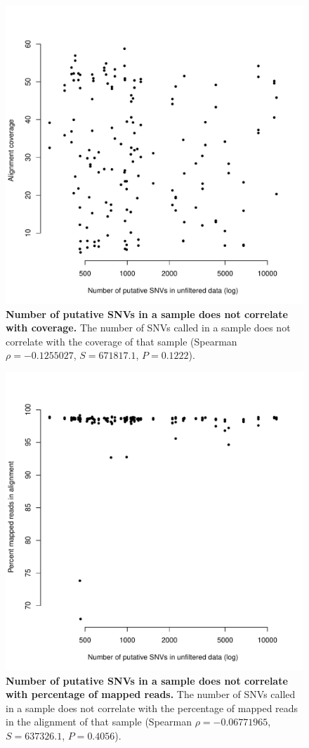 \documentclass[11 pt]{article} %
\begin{document}
\begin{figure}
\centerline{
\includegraphics[width=5in]{QualFigure1.pdf} }
\caption{\textbf{Number of putative SNVs in a sample does not correlate with coverage.} The number of SNVs called in a sample does not correlate with the coverage of that sample  (Spearman $\rho=-0.1255027$, $S=671817.1$, $P=0.1222$).} 
\label{fig:coverage}
\end{figure}

\begin{figure}
\centerline{
\includegraphics[width=5in]{QualFigure2.pdf} }
\caption{\textbf{Number of putative SNVs in a sample does not correlate with percentage of mapped reads.} The number of SNVs called in a sample does not correlate with the percentage of mapped reads in the alignment of that sample  (Spearman $\rho=-0.06771965$, $S=637326.1$, $P=0.4056$).} 
\label{fig:percent_mapped}
\end{figure}
\end{document}
